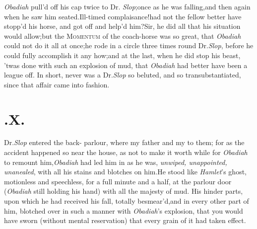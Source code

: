 \documentclass{article}
\begin{document}
\textit{Obadiah} pull’d off his cap twice to Dr.\@
\textit{Slop};\tsh once as he was falling,\tsk and then again
when he saw him seated.\tsk Ill-timed
complaisance!\tsh had not the fellow better have stopp’d his
horse, and got off and help’d him?\tsk Sir, he did all that
his situation would allow;\tsk but the\break
\textsc{Momentum} of the coach-horse was so great, that \textit{Obadiah} could not do it
all at once;\tsh he rode in a circle three times round Dr.\@ \textit{Slop},
before he could fully accomplish it any how;\tsk and at the last, when
he did stop his beast, ’twas done with such an explosion of
mud, that \textit{Obadiah} had better have been a league
off.\break
In short, never was a Dr.\@ \textit{Slop} so beluted, and so
transubstantiated, since that affair\break
came into fashion.\\
\newpage
\section{.\enspace  X.}

 Dr.\@ \textit{Slop} entered the back-\break
parlour, where my father and my\break
{}\break
{}
to them; for as the accident happened so near the house, as not to make it worth while for
\textit{Obadiah} to remount him,\tsk\break \textit{Obadiah} had led
him in as he was, \textit{un\-wiped, unappointed, unanealed}, with all
his stains and blotches on him.\tsk He stood like
\textit{Hamlet}’s ghost, motionless and speechless, for a full
minute and a half, at the parlour door (\textit{Obadiah} still holding
his hand) with all the majesty of mud. His hinder parts, upon which he had
received his fall, totally besmear’d,\tsh and
in every other part of him, blotched over in such a manner with
\textit{Obadiah}’s explosion, that you would have sworn
(without mental reservation) that every grain of it had taken
effect.
\end{document}

